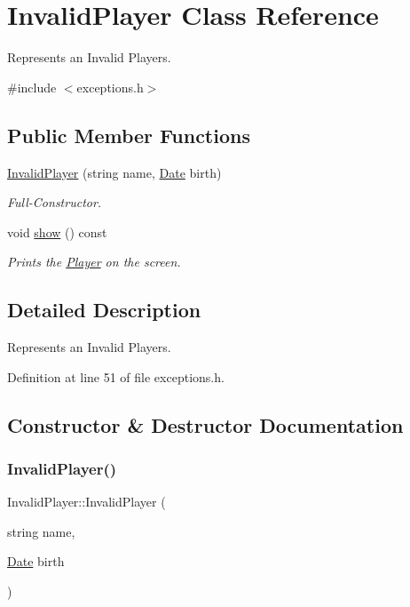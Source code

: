 \hypertarget{class_invalid_player}{}\section{Invalid\+Player Class Reference}
\label{class_invalid_player}


Represents an Invalid Players.  




{\ttfamily \#include $<$exceptions.\+h$>$}

\subsection*{Public Member Functions}
\begin{DoxyCompactItemize}
\item 
\hyperlink{class_invalid_player_a311099a3c76237e49e448de25aef4a89}{Invalid\+Player} (string name, \hyperlink{class_date}{Date} birth)
\begin{DoxyCompactList}\small\item\em Full-\/\+Constructor. \end{DoxyCompactList}\item 
void \hyperlink{class_invalid_player_a5254e7755b435020a786a2de1c20418f}{show} () const
\begin{DoxyCompactList}\small\item\em Prints the \hyperlink{class_player}{Player} on the screen. \end{DoxyCompactList}\end{DoxyCompactItemize}


\subsection{Detailed Description}
Represents an Invalid Players. 

Definition at line 51 of file exceptions.\+h.



\subsection{Constructor \& Destructor Documentation}
\hypertarget{class_invalid_player_a311099a3c76237e49e448de25aef4a89}{}\label{class_invalid_player_a311099a3c76237e49e448de25aef4a89} 
\subsubsection{\texorpdfstring{Invalid\+Player()}{InvalidPlayer()}}
{\footnotesize\ttfamily Invalid\+Player\+::\+Invalid\+Player (\begin{DoxyParamCaption}\item[{string}]{name,  }\item[{\hyperlink{class_date}{Date}}]{birth }\end{DoxyParamCaption})}



